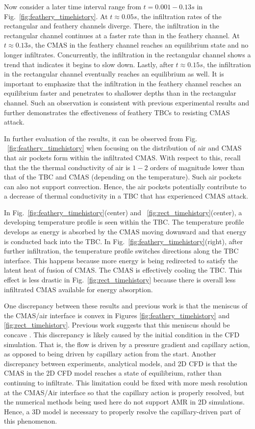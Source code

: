 \documentclass[%
 aip,
 amsmath,amssymb,
 reprint,%
floatfix]{revtex4-1}
\begin{document}
Now consider a later time interval range from $t=0.001 - 0.13 s$ in Fig.~\ref{fig:feathery_timehistory}.
At $t \approx 0.05s$, the infiltration rates of the rectangular and feathery channels diverge.
There, the infiltration in the rectangular channel continues at a faster rate than in the feathery channel.
At $t \approx 0.13 s$, the CMAS in the feathery channel reaches an equilibrium state and no longer infiltrates. Concurrently, the infiltration in the rectangular channel shows a trend that indicates it begins to slow down.
Lastly, after $t \approx 0.15 s$, the infiltration in the rectangular channel eventually reaches an equilibrium as well.
It is important to emphasize that the infiltration in the feathery channel reaches an equilibrium faster and penetrates to shallower depths than in the rectangular channel.
Such an observation is consistent with previous experimental results \cite{Naraparaju2017} and further demonstrates the effectiveness of feathery TBCs to resisting CMAS attack.

In further evaluation of the results, it can be observed from Fig. ~\ref{fig:feathery_timehistory} when focusing on the distribution of air and CMAS that air pockets form within the infiltrated CMAS.
With respect to this, recall that the the thermal conductivity of air is $1-2$ orders of magnitude lower than that of the TBC and CMAS (depending on the temperature). Such air pockets can also not support convection. Hence, the air pockets potentially contribute to a decrease of thermal conductivity in a TBC that has experienced CMAS attack.

In Fig.~\ref{fig:feathery_timehistory}(center) and ~\ref{fig:rect_timehistory}(center), a developing temperature profile is seen within the TBC. The temperature profile develops as energy is absorbed by the CMAS moving downward and that energy is conducted back into the TBC. 
In Fig.~\ref{fig:feathery_timehistory}(right), after further infiltration, the temperature profile switches directions along the TBC interface.
This happens because more energy is being redirected to satisfy the latent heat of fusion of CMAS. The CMAS is effectively cooling the TBC.
This effect is less drastic in Fig.~\ref{fig:rect_timehistory} because there is overall less infiltrated CMAS available for energy absorption.

One discrepancy between these results and previous work is that the meniscus of the CMAS/air interface is convex in Figures \ref{fig:feathery_timehistory} and \ref{fig:rect_timehistory}. Previous work suggests that this meniscus should be concave \cite{Naraparaju2019}. This discrepancy is likely caused by the initial condition in the CFD simulation. That is, the flow is driven by a pressure gradient and capillary action, as opposed to being driven by capillary action from the start. Another discrepancy between experiments, analytical models, and 2D CFD is that the CMAS in the 2D CFD model reaches a state of equilibrium, rather than continuing to infiltrate. This limitation could be fixed with more mesh resolution at the CMAS/Air interface so that the capillary action is properly resolved, but the numerical methods being used here do not support AMR in 2D simulations. Hence, a 3D model is necessary to properly resolve the capillary-driven part of this phenomenon. 
\end{document}
